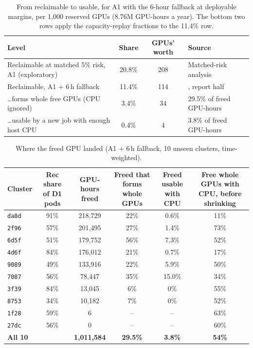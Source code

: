 \begin{table}[H]
\centering\small
\caption{From reclaimable to usable, for A1 with the 6-hour fallback at deployable margins, per 1{,}000 reserved GPUs (8.76M GPU-hours a year). The bottom two rows apply the capacity-replay fractions to the 11.4\% row.}
\label{tab:chain}
\begin{tabularx}{\linewidth}{@{}Lccp{4.5cm}@{}}
\toprule
Level & Share & GPUs' worth & Source \\
\midrule
Reclaimable at matched 5\% risk, A1 (exploratory) & 20.8\% & 208 & Matched-risk analysis \\
Reclaimable, A1 + 6\,h fallback & 11.4\% & 114 & , report half \\
\quad\ldots forms whole free GPUs (CPU ignored) & 3.4\% & 34 & 29.5\% of freed GPU-hours \\
\quad\ldots usable by a new job with enough host CPU & 0.4\% & 4 & 3.8\% of freed GPU-hours \\
\bottomrule
\end{tabularx}
\end{table}

\begin{table}[H]
\centering\small
\caption{Where the freed GPU landed (A1 + 6\,h fallback, 10 unseen clusters, time-weighted).}
\label{tab:usable}
\begin{tabular}{@{}lccccc@{}}
\toprule
Cluster & \makecell{Rec share\\of D1 pods} & \makecell{GPU-hours\\freed} & \makecell{Freed that forms\\whole GPUs} & \makecell{Freed usable\\with CPU} & \makecell{Free whole GPUs with\\CPU, before shrinking} \\
\midrule
\texttt{da8d} & 91\% & 218{,}729 & 22\% & 0.6\% & 11\% \\
\texttt{2f96} & 57\% & 201{,}495 & 27\% & 1.4\% & 73\% \\
\texttt{6d5f} & 51\% & 179{,}752 & 56\% & 7.3\% & 52\% \\
\texttt{4d6f} & 84\% & 176{,}012 & 21\% & 0.7\% & 17\% \\
\texttt{9089} & 49\% & 133{,}916 & 22\% & 5.9\% & 50\% \\
\texttt{7087} & 56\% & 78{,}447 & 35\% & 15.0\% & 34\% \\
\texttt{3f39} & 84\% & 13{,}045 & 6\% & 0\% & 55\% \\
\texttt{8753} & 34\% & 10{,}182 & 7\% & 0\% & 52\% \\
\texttt{1f28} & 59\% & 6 & -- & -- & 63\% \\
\texttt{27dc} & 56\% & 0 & -- & -- & 60\% \\
\midrule
\textbf{All 10} & & \textbf{1{,}011{,}584} & \textbf{29.5\%} & \textbf{3.8\%} & \textbf{54\%} \\
\bottomrule
\end{tabular}
\end{table}

